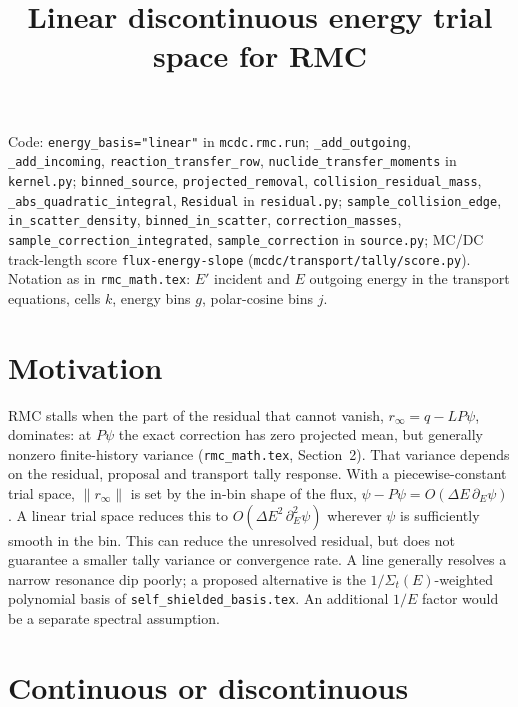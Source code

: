 \documentclass[11pt]{article}
\title{Linear discontinuous energy trial space for RMC}
\date{}
\newcommand{\Sigt}{\Sigma_t}
\begin{document}
\maketitle

\noindent Code: \texttt{energy\_basis="linear"} in \texttt{mcdc.rmc.run};
\texttt{\_add\_outgoing}, \texttt{\_add\_incoming}, \texttt{reaction\_transfer\_row},
\texttt{nuclide\_transfer\_moments} in \texttt{kernel.py};
\texttt{binned\_source}, \texttt{projected\_removal}, \texttt{collision\_residual\_mass},
\texttt{\_abs\_quadratic\_integral}, \texttt{Residual} in \texttt{residual.py};
\texttt{sample\_collision\_edge}, \texttt{in\_scatter\_density},
\texttt{binned\_in\_scatter}, \texttt{correction\_masses},
\texttt{sample\_correction\_integrated}, \texttt{sample\_correction} in
\texttt{source.py}; MC/DC track-length score \texttt{flux-energy-slope}
(\texttt{mcdc/transport/tally/score.py}). Notation as in \texttt{rmc\_math.tex}:
$E'$ incident and $E$ outgoing energy in the transport equations, cells $k$, energy
bins $g$, polar-cosine bins $j$.

\section{Motivation}

RMC stalls when the part of the residual that cannot vanish, $r_\infty = q - L P\psi$,
dominates: at $P\psi$ the exact correction has zero projected mean, but generally
nonzero finite-history variance (\texttt{rmc\_math.tex}, Section~2). That variance
depends on the residual, proposal and transport tally response. With a
piecewise-constant trial space, $\|r_\infty\|$ is set by the in-bin shape of the flux,
$\psi - P\psi = O(\Delta E\,\partial_E\psi)$. A linear trial space reduces this to
$O(\Delta E^2\,\partial_E^2\psi)$ wherever $\psi$ is sufficiently smooth in the bin.
This can reduce the unresolved residual, but does not guarantee a smaller tally
variance or convergence rate. A line generally resolves a narrow resonance dip
poorly; a proposed alternative is the $1/\Sigt(E)$-weighted polynomial basis of
\texttt{self\_shielded\_basis.tex}. An additional $1/E$ factor would be a separate
spectral assumption.

\section{Continuous or discontinuous}
\end{document}
